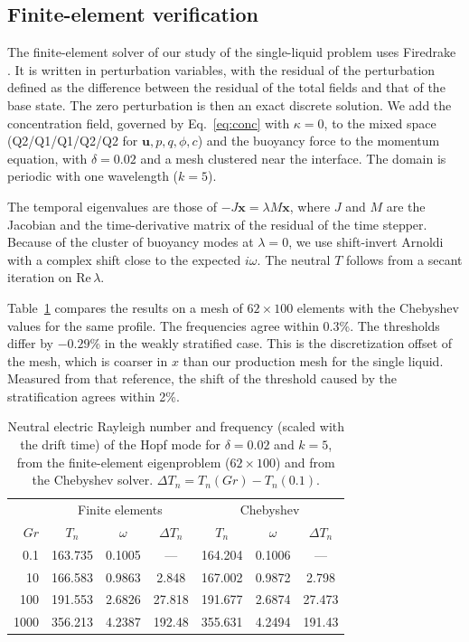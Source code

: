\documentclass[aip,pof,reprint,amsmath,amssymb]{revtex4-2}
\newcommand{\bu}{\bm{u}}
\begin{document}
\subsection{Finite-element verification}

The finite-element solver of our study of the single-liquid problem uses
Firedrake \cite{Rathgeber2016}. It is written in perturbation variables, with the
residual of the perturbation defined as the difference between the residual of the total
fields and that of the base state. The zero perturbation is then an exact discrete
solution. We add the concentration field, governed by Eq.~\eqref{eq:conc} with
$\kappa=0$, to the mixed space (Q2/Q1/Q1/Q2/Q2 for $\bu,p,q,\phi,c$) and the buoyancy force
to the momentum equation, with $\delta=0.02$ and
a mesh clustered near the interface. The domain is periodic with one wavelength
($k=5$).

The temporal eigenvalues are those of $-J\bm x=\lambda M\bm x$, where $J$ and $M$ are the
Jacobian and the time-derivative matrix of the residual of the time stepper. Because of
the cluster of buoyancy modes at $\lambda=0$, we use shift-invert Arnoldi with a complex
shift close to the expected $i\omega$. The neutral $T$ follows from a secant iteration on
$\mathrm{Re}\,\lambda$.

Table~\ref{tab:firedrake} compares the results on a mesh of $62\times100$ elements with the
Chebyshev values for the same profile. The frequencies agree within 0.3\%. The thresholds
differ by $-0.29\%$ in the weakly stratified case. This is the discretization offset of
the mesh, which is coarser in $x$ than our production mesh for the single liquid. Measured
from that reference, the shift of the threshold caused by the stratification agrees within
2\%.

\begin{table}
\caption{Neutral electric Rayleigh number and frequency (scaled with the drift time) of the Hopf mode for
$\delta=0.02$ and $k=5$, from the finite-element eigenproblem ($62\times100$) and from the
Chebyshev solver. $\Delta T_n=T_n(Gr)-T_n(0.1)$.}
\label{tab:firedrake}
\begin{ruledtabular}
\begin{tabular}{rcccccc}
 & \multicolumn{3}{c}{Finite elements} & \multicolumn{3}{c}{Chebyshev}\\
$Gr$ & $T_n$ & $\omega$ & $\Delta T_n$ & $T_n$ & $\omega$ & $\Delta T_n$\\\hline
0.1 & 163.735 & 0.1005 & --- & 164.204 & 0.1006 & ---\\
10 & 166.583 & 0.9863 & 2.848 & 167.002 & 0.9872 & 2.798\\
100 & 191.553 & 2.6826 & 27.818 & 191.677 & 2.6874 & 27.473\\
1000 & 356.213 & 4.2387 & 192.48 & 355.631 & 4.2494 & 191.43\\
\end{tabular}
\end{ruledtabular}
\end{table}
\end{document}

